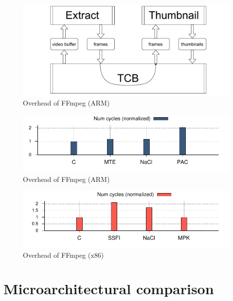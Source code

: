 \begin{figure}[!htbp]
	\includegraphics[width=1.0\columnwidth]{figures/ffmpeg-pinpeline.pdf}
\caption{Overhead of FFmpeg (ARM)}
	\label{fig:ffmpeg-arm}
\end{figure}

\begin{figure}[!htbp]
	\includegraphics[width=1.0\columnwidth]{figures/ffmpeg-arm.pdf}
\caption{Overhead of FFmpeg (ARM)}
	\label{fig:ffmpeg-arm}
\end{figure}

\begin{figure}[!htbp]
	\includegraphics[width=1.0\columnwidth]{figures/ffmpeg-x86.pdf}
\caption{Overhead of FFmpeg (x86)}
	\label{fig:ffmpeg-x86}
\end{figure}

\section{Microarchitectural comparison}

